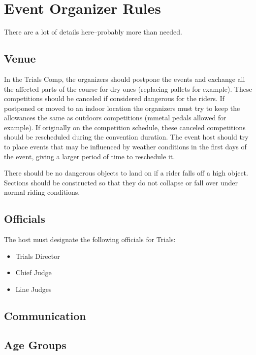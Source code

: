 \chapter{Event Organizer Rules}

\begin{comment-2016}
There are a lot of details here--probably more than needed.
\end{comment-2016}

\section{Venue}

In the Trials Comp, the organizers should postpone the events and exchange all the affected parts of the course for dry ones (replacing pallets for example).
These competitions should be canceled if considered dangerous for the riders.
If postponed or moved to an indoor location the organizers must try to keep the allowances the same as outdoors competitions (mmetal pedals allowed for example).
If originally on the competition schedule, these canceled competitions should be rescheduled during the convention duration.
The event host should try to place events that may be influenced by weather conditions in the first days of the event, giving a larger period of time to reschedule it.

There should be no dangerous objects to land on if a rider falls off a high object.
Sections should be constructed so that they do not collapse or fall over under normal riding conditions.

\section{Officials}

The host must designate the following officials for Trials:
\begin{itemize}
\item Trials Director
\item Chief Judge
\item Line Judges
\end{itemize}

\section{Communication}

\section{Age Groups}

